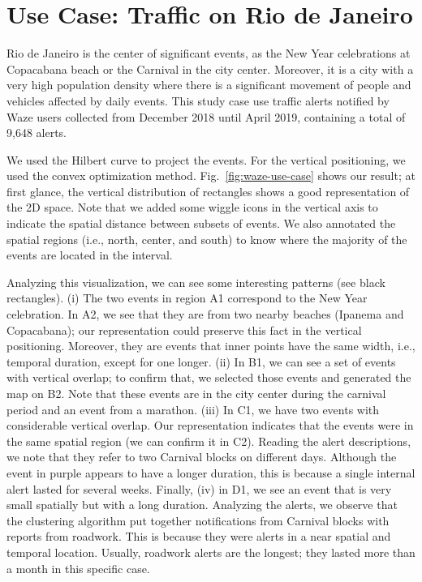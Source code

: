\section{Use Case: Traffic on Rio de Janeiro}
\label{sec:use-case}

Rio de Janeiro is the center of significant events, as the New Year celebrations at Copacabana beach or the Carnival in the city center. 
%
Moreover, it is a city with a very high population density where there is a significant movement of people and vehicles affected by daily events. 
%
This study case use traffic alerts notified by Waze users collected from December 2018 until April 2019, containing a total of 9,648 alerts.

We used the Hilbert curve to project the events.
%
For the vertical positioning, we used the convex optimization method. 
%
Fig.~\ref{fig:waze-use-case} shows our result; at first glance, the vertical distribution of rectangles shows a good representation of the 2D space.
%
Note that we added some wiggle icons in the vertical axis to indicate the spatial distance between subsets of events. 
%
We also annotated the spatial regions (i.e., north, center, and south) to know where the majority of the events are located in the interval.

Analyzing this visualization, we can see some interesting patterns (see black rectangles). 
%
(i) The two events in region A1 correspond to the New Year celebration. 
%
In A2, we see that they are from two nearby beaches (Ipanema and Copacabana); our representation could preserve this fact in the vertical positioning. 
%
Moreover, they are events that inner points have the same width, i.e.,  temporal duration, except for one longer.
%
(ii) In B1, we can see a set of events with vertical overlap; to confirm that, we selected those events and generated the map on B2. 
%
Note that these events are in the city center during the carnival period and an event from a marathon.
%
(iii) In C1, we have two events with considerable vertical overlap. 
%
Our representation indicates that the events were in the same spatial region (we can confirm it in C2). 
%
Reading the alert descriptions, we note that they refer to two Carnival blocks on different days. 
%
Although the event in purple appears to have a longer duration, this is because a single internal alert lasted for several weeks. 
%
Finally, (iv) in D1, we see an event that is very small spatially but with a long duration.
%
Analyzing the alerts, we observe that the clustering algorithm put together notifications from Carnival blocks with reports from roadwork. 
%
This is because they were alerts in a near spatial and temporal location. 
%
Usually, roadwork alerts are the longest; they lasted more than a month in this specific case. 

